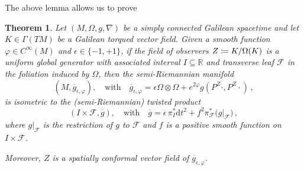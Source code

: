 \documentclass[12pt]{article}
\newcommand{\diff}{\mathrm{d}}
\newcommand{\dt}{\diff t}
\newcommand{\coloneq}{\vcentcolon\mathrel{\mkern -1.2mu}\mathrel{=}}
\newcommand{\spacetime}{(M,\Omega,g,\nabla)}
\DeclareMathOperator{\An}{\text{An}\Omega}
\newtheorem{theor}[defi]{Theorem}
\def\R{\mathbb R}
\def\f{\mathcal F}
\begin{document}
The above lemma allows us to prove
\begin{theor}\label{theor:semi-Riemannian isometry}
    Let $\spacetime$ be a simply connected Galilean spacetime %
    and let $K\in \Gamma(TM)$ be a Galilean torqued vector field. Given a smooth function $\varphi\in C^\infty(M)$ and $\epsilon\in \{-1,+1\}$, if the field of observers $Z\coloneq K/\Omega(K)$ is a uniform global generator with associated interval $I\subseteq \R$ and transverse leaf $\f$ in the foliation induced by $\Omega$, then
    the semi-Riemannian manifold
    \[
    (M,\overline{g}_{\epsilon,\varphi}), \quad \text{with} \quad \overline{g}_{\epsilon,\varphi} = \epsilon \Omega \otimes \Omega + e^{2\varphi} g(P^Z\cdot, P^Z \cdot)\,,
    \]
    is isometric to the (semi-Riemannian) twisted product
    \[
    (I \times \f, \overline{g}), \quad \text{with} \quad \overline{g} = \epsilon \, \pi_I^* \dt^2 +  f^2 \pi_{\f}^* \big(g|_{\f}\big)\,,
    \]
    where $g|_{\f}$ is the restriction of $g$ to $\f$ and $f$ is a positive smooth function on $I\times \f$. 

    Moreover, $Z$ is a spatially conformal vector field of $\overline{g}_{\epsilon,\varphi}$. %
    
\end{theor}
\end{document}
